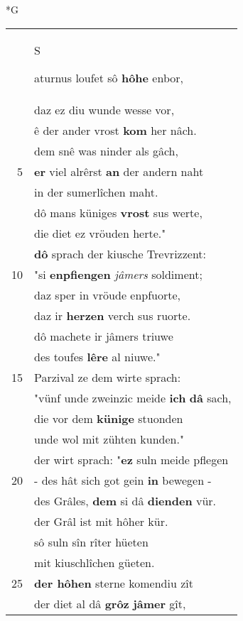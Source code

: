\documentclass[8pt,a4paper,notitlepage]{article}
\begin{document}
\newpage
\begin{table}[ht]
\begin{minipage}[t]{0.5\linewidth}
\small
\begin{center}*G
\end{center}
\begin{tabular}{rl}
 & \begin{large}S\end{large}aturnus loufet sô \textbf{hôhe} enbor,\\ 
 & daz ez diu wunde wesse vor,\\ 
 & ê der ander vrost \textbf{kom} her nâch.\\ 
 & dem snê was ninder als gâch,\\ 
5 & \textbf{er} viel alrêrst \textbf{an} der andern naht\\ 
 & in der sumerlîchen maht.\\ 
 & dô mans küniges \textbf{vrost} sus werte,\\ 
 & die diet ez vröuden herte."\\ 
 & \textbf{dô} sprach der kiusche Trevrizzent:\\ 
10 & "si \textbf{enpfiengen} \textit{jâmers} soldiment;\\ 
 & daz sper in vröude enpfuorte,\\ 
 & daz ir \textbf{herzen} verch sus ruorte.\\ 
 & dô machete ir jâmers triuwe\\ 
 & des toufes \textbf{lêre} al niuwe."\\ 
15 & Parzival ze dem wirte sprach:\\ 
 & "vünf unde zweinzic meide \textbf{ich} \textbf{dâ} sach,\\ 
 & die vor dem \textbf{künige} stuonden\\ 
 & unde wol mit zühten kunden."\\ 
 & der wirt sprach: "\textbf{ez} suln meide pflegen\\ 
20 & - des hât sich got gein \textbf{in} bewegen -\\ 
 & des Grâles, \textbf{dem} si dâ \textbf{dienden} vür.\\ 
 & der Grâl ist mit hôher kür.\\ 
 & sô suln sîn rîter hüeten\\ 
 & mit kiuschlîchen güeten.\\ 
25 & \textbf{der hôhen} sterne komendiu zît\\ 
 & der diet al dâ \textbf{grôz} \textbf{jâmer} gît,\\ 

\end{tabular}
\end{minipage}
\end{table}
\end{document}
